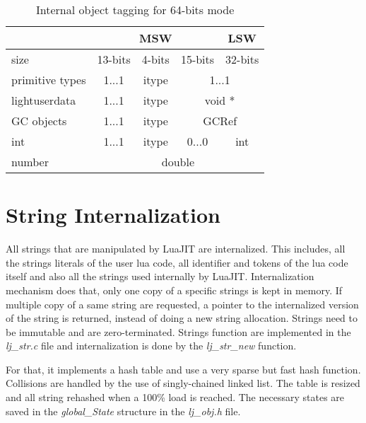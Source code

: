 \begin{table}[H]
\centering
\caption{Internal object tagging for 64-bits mode}
\label{tab:tagged-gc64}
\begin{tabular}{l|c|c|c|c|}
\cline{2-5}
                                      & \multicolumn{3}{c|}{MSW}         & LSW         \\ \hline
\multicolumn{1}{|l|}{size}            & 13-bits & 4-bits & 15-bits       & 32-bits     \\ \hline
\multicolumn{1}{|l|}{primitive types} & 1...1   & itype  & \multicolumn{2}{c|}{1...1}  \\
\multicolumn{1}{|l|}{lightuserdata}   & 1...1   & itype  & \multicolumn{2}{c|}{void *} \\
\multicolumn{1}{|l|}{GC objects}      & 1...1   & itype  & \multicolumn{2}{c|}{GCRef}  \\
\multicolumn{1}{|l|}{int}             & 1...1   & itype  & 0...0         & int         \\
\multicolumn{1}{|l|}{number}          & \multicolumn{4}{c|}{double}                    \\ \hline
\end{tabular}
\end{table}

\section{String Internalization}
\label{Sec:string-inter}

All strings that are manipulated by LuaJIT are internalized. This includes, all
the strings literals of the user lua code, all identifier and tokens of the lua
code itself and also all the strings used internally by LuaJIT. Internalization
mechanism does that, only one copy of a specific strings is kept in memory. If
multiple copy of a same string are requested, a pointer to the internalized
version of the string is returned, instead of doing a new string allocation.
Strings need to be immutable and are zero-terminated. Strings function are
implemented in the \emph{lj\_str.c} file and internalization is done by the
\emph{lj\_str\_new} function.

For that, it implements a hash table and use a very sparse but fast hash
function. Collisions are handled by the use of singly-chained linked list.
The table is resized and all string rehashed when a 100\% load is reached.
The necessary states are saved in the \emph{global\_State} structure in the
\emph{lj\_obj.h} file.

